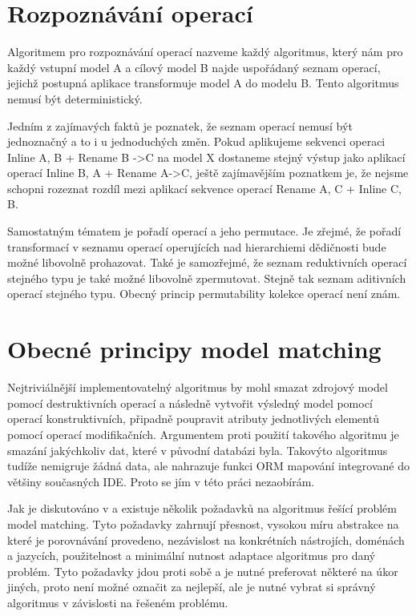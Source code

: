 \documentclass[11pt,twoside,a4paper]{book}
\begin{document}
\FloatBarrier

\section{Rozpoznávání operací}

Algoritmem pro rozpoznávání operací nazveme každý algoritmus, který nám pro
každý vstupní model A a cílový model B najde uspořádaný seznam operací, jejichž
postupná aplikace transformuje model A do modelu B. Tento algoritmus nemusí být
deterministický.

Jedním z zajímavých faktů je poznatek, že seznam operací nemusí být jednoznačný
a to i u jednoduchých změn. Pokud aplikujeme sekvenci operaci Inline A, B + 
Rename B ->C na model X dostaneme stejný výstup jako aplikací operací Inline B,
A + Rename A->C, ještě zajímavějším poznatkem je, že nejsme schopni rozeznat
rozdíl mezi aplikací sekvence operací Rename A, C + Inline C, B.

Samostatným tématem je pořadí operací a jeho permutace. Je zřejmé, že pořadí
transformací v seznamu operací operujících nad hierarchiemi dědičnosti bude
možné libovolně prohazovat.
Také je samozřejmé, že seznam reduktivních operací stejného typu je také možné
libovolně zpermutovat. Stejně tak seznam aditivních operací stejného typu.
Obecný princip permutability kolekce operací není znám. 

\section{Obecné principy model matching} \label{model_matching_principles}
Nejtriviálnější implementovatelný algoritmus by mohl smazat zdrojový model
pomocí destruktivních operací a následně vytvořit výsledný model pomocí operací
konstruktivních, připadně poupravit atributy jednotlivých elementů pomocí
operací modifikačních. Argumentem proti použití takového algoritmu je smazání
jakýchkoliv dat, které v původní databázi byla. Takovýto algoritmus tudíže
nemigruje žádná data, ale nahrazuje funkci ORM mapování integrované
do většiny současných IDE. Proto se jím v této práci nezaobírám.

Jak je diskutováno v \cite{diff_merge_diagrams} a
\cite{Kolovos:Different_models} existuje několik požadavků na algoritmus řešící
problém model matching. Tyto požadavky zahrnují přesnost, vysokou míru
abstrakce na které je porovnávání provedeno, nezávislost na konkrétních
nástrojích, doménách a jazycích, použitelnost a minimální nutnost adaptace
algoritmus pro daný problém. Tyto požadavky jdou proti sobě a je nutné
preferovat některé na úkor jiných, proto není možné označit za nejlepší, ale je
nutné vybrat si správný algoritmus v závislosti na řešeném problému.
\end{document}
